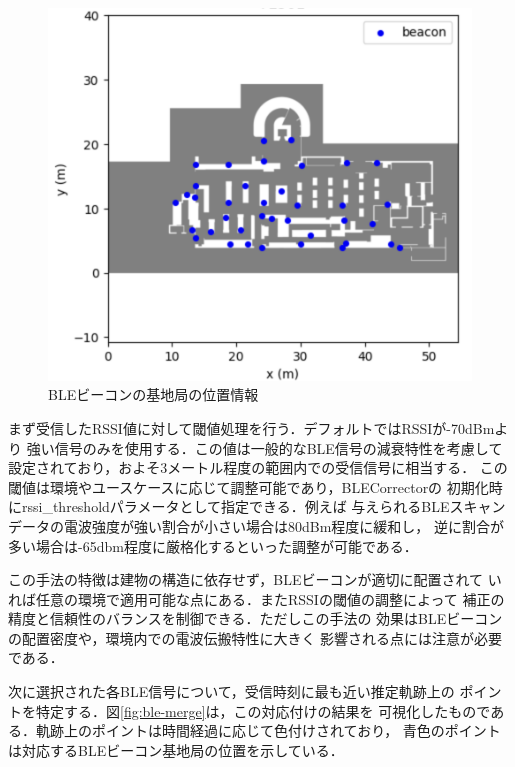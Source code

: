 \begin{figure}[H]
	\centering
	\includegraphics[width=\linewidth]{image/ble-beacon-position.jpg}
	\caption{BLEビーコンの基地局の位置情報}    \label{fig:ble-beacon-position}
\end{figure}

まず受信したRSSI値に対して閾値処理を行う．デフォルトではRSSIが-70dBmより
強い信号のみを使用する．この値は一般的なBLE信号の減衰特性を考慮して
設定されており，およそ3メートル程度の範囲内での受信信号に相当する．
この閾値は環境やユースケースに応じて調整可能であり，BLECorrectorの
初期化時にrssi\_thresholdパラメータとして指定できる．例えば
与えられるBLEスキャンデータの電波強度が強い割合が小さい場合は80dBm程度に緩和し，
逆に割合が多い場合は-65dbm程度に厳格化するといった調整が可能である．

この手法の特徴は建物の構造に依存せず，BLEビーコンが適切に配置されて
いれば任意の環境で適用可能な点にある．またRSSIの閾値の調整によって
補正の精度と信頼性のバランスを制御できる．ただしこの手法の
効果はBLEビーコンの配置密度や，環境内での電波伝搬特性に大きく
影響される点には注意が必要である．

次に選択された各BLE信号について，受信時刻に最も近い推定軌跡上の
ポイントを特定する．図\ref{fig:ble-merge}は，この対応付けの結果を
可視化したものである．軌跡上のポイントは時間経過に応じて色付けされており，
青色のポイントは対応するBLEビーコン基地局の位置を示している．

